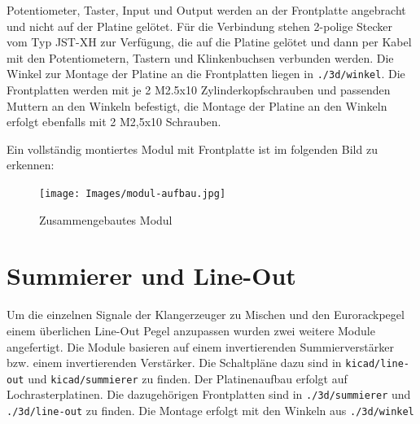 Potentiometer, Taster, Input und Output werden an der Frontplatte angebracht und nicht auf der Platine gelötet. Für die Verbindung stehen 2-polige Stecker vom Typ JST-XH zur Verfügung, die auf die Platine gelötet und dann per Kabel mit den Potentiometern, Tastern und Klinkenbuchsen verbunden werden.
Die Winkel zur Montage der Platine an die Frontplatten liegen in \texttt{./3d/winkel}.
Die Frontplatten werden mit je 2 M2.5x10 Zylinderkopfschrauben und passenden Muttern an den Winkeln befestigt, die Montage der Platine an den Winkeln erfolgt ebenfalls mit 2 M2,5x10 Schrauben.

Ein vollständig montiertes Modul mit Frontplatte ist im folgenden Bild zu erkennen:
\begin{figure}[H]
    \centering
    \texttt{[image: Images/modul-aufbau.jpg]}
    \caption[Zusammengebautes Modul]{Zusammengebautes Modul}
    \label{fig:Zusammengebautes Modul}
\end{figure}
\section{Summierer und Line-Out}
Um die einzelnen Signale der Klangerzeuger zu Mischen und den Eurorackpegel einem überlichen Line-Out Pegel anzupassen wurden zwei weitere Module angefertigt.
Die Module basieren auf einem invertierenden Summierverstärker bzw. einem invertierenden Verstärker.
Die Schaltpläne dazu sind in \texttt{kicad/line-out} und \texttt{kicad/summierer} zu finden.
Der Platinenaufbau erfolgt auf Lochrasterplatinen.
Die dazugehörigen Frontplatten sind in \texttt{./3d/summierer} und \texttt{./3d/line-out} zu finden. Die Montage erfolgt mit den Winkeln aus \texttt{./3d/winkel}
